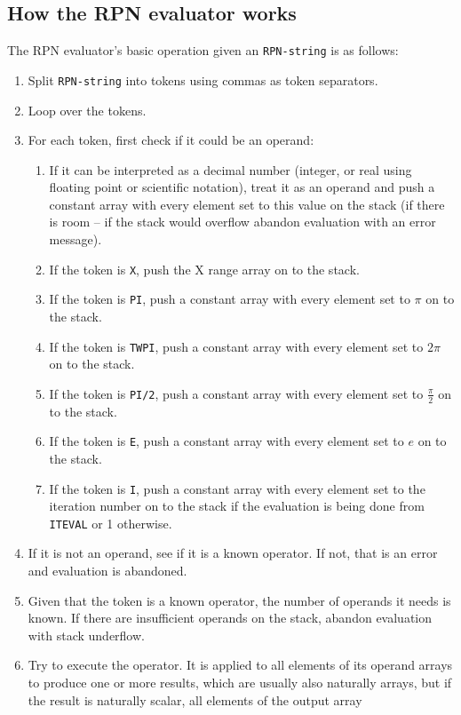 \documentclass[a4paper,twoside,11pt]{article}
\begin{document}
\subsection{How the RPN evaluator works}
The RPN evaluator's basic operation given an \texttt{RPN-string} is as follows:
\begin{enumerate}
\item Split \texttt{RPN-string} into tokens using commas as token separators.
\item Loop over the tokens.
\item For each token, first check if it could be an operand:
  \begin{enumerate}
  \item If it can be interpreted as a decimal number (integer, or real using floating point or scientific notation), treat it as an
  	operand and push a constant array with every element set to this value on the stack 
  	(if there is room -- if the stack would overflow abandon evaluation with an error message).
  \item If the token is \texttt{X}, push the X range array on to the stack.
  \item If the token is \texttt{PI}, push a constant array with every element set to $\pi$ on to the stack.
  \item If the token is \texttt{TWPI}, push a constant array with every element set to $2 \pi$ on to the stack.
  \item If the token is \texttt{PI/2}, push a constant array with every element set to $\frac{\pi}{2}$ on to the stack.
  \item If the token is \texttt{E}, push a constant array with every element set to $e$ on to the stack.
  \item If the token is \texttt{I}, push a constant array with every element set to the iteration number on to the stack if
  	the evaluation is being done from \texttt{ITEVAL} or 1 otherwise.
  \end{enumerate}
\item If it is not an operand, see if it is a known operator. If not, that is an error and evaluation is abandoned.
\item Given that the token is a known operator, the number of operands it needs is known. If there are insufficient
	operands on the stack, abandon evaluation with stack underflow.
\item Try to execute the operator. It is applied to all elements of its operand arrays to produce one or more
	results, which are usually also naturally arrays, but if the result is naturally scalar, all elements of the output array

\end{enumerate}
\end{document}
